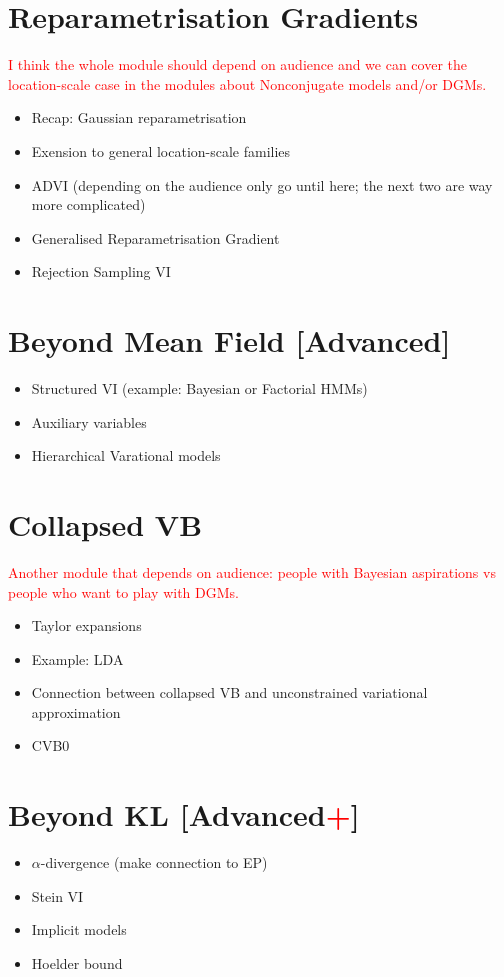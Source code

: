 \documentclass[11pt, a4paper]{article}
\newcommand{\wnote}[1]{\textcolor{red}{#1}}
\begin{document}
\section{Reparametrisation Gradients}

\wnote{I think the whole module should depend on audience and we can cover the location-scale case in the modules about Nonconjugate models and/or DGMs.}

\begin{itemize}
\item Recap: Gaussian reparametrisation
\item Exension to general location-scale families
\item ADVI (depending on the audience only go until here; the next two are way more complicated)
\item Generalised Reparametrisation Gradient
\item Rejection Sampling VI
\end{itemize}

\section{Beyond Mean Field [Advanced]}
\begin{itemize}
\item Structured VI (example: Bayesian or Factorial HMMs)
\item Auxiliary variables
\item Hierarchical Varational models 
\end{itemize}

\section{Collapsed VB}

\wnote{Another module that depends on audience: people with Bayesian aspirations vs people who want to play with DGMs.}

\begin{itemize}
\item Taylor expansions
\item Example: LDA
\item Connection between collapsed VB and unconstrained variational approximation
\item CVB0
\end{itemize}

\section{Beyond KL [Advanced\wnote{+}]}
\begin{itemize}
\item $ \alpha $-divergence (make connection to EP)
\item Stein VI
\item Implicit models
\item Hoelder bound
\end{itemize}
\end{document}
